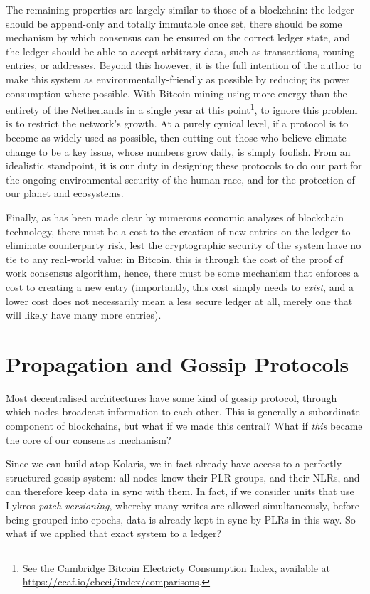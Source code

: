 \documentclass{extreport}
\begin{document}
The remaining properties are largely similar to those of a blockchain: the ledger should be append-only and totally immutable once set, there should be some mechanism by which consensus can be ensured on the correct ledger state, and the ledger should be able to accept arbitrary data, such as transactions, routing entries, or addresses. Beyond this however, it is the full intention of the author to make this system as environmentally-friendly as possible by reducing its power consumption where possible. With Bitcoin mining using more energy than the entirety of the Netherlands in a single year at this point\footnote{See the Cambridge Bitcoin Electricty Consumption Index, available at \url{https://ccaf.io/cbeci/index/comparisons}.}, to ignore this problem is to restrict the network's growth. At a purely cynical level, if a protocol is to become as widely used as possible, then cutting out those who believe climate change to be a key issue, whose numbers grow daily, is simply foolish. From an idealistic standpoint, it is our duty in designing these protocols to do our part for the ongoing environmental security of the human race, and for the protection of our planet and ecosystems.

Finally, as has been made clear by numerous economic analyses of blockchain technology, there must be a cost to the creation of new entries on the ledger to eliminate counterparty risk, lest the cryptographic security of the system have no tie to any real-world value: in Bitcoin, this is through the cost of the proof of work consensus algorithm, hence, there must be some mechanism that enforces a cost to creating a new entry (importantly, this cost simply needs to \emph{exist}, and a lower cost does not necessarily mean a less secure ledger at all, merely one that will likely have many more entries).

\chapter{Propagation and Gossip Protocols}
\label{sec:org9c2aa3a}

Most decentralised architectures have some kind of gossip protocol, through which nodes broadcast information to each other. This is generally a subordinate component of blockchains, but what if we made this central? What if \emph{this} became the core of our consensus mechanism?

Since we can build atop Kolaris, we in fact already have access to a perfectly structured gossip system: all nodes know their PLR groups, and their NLRs, and can therefore keep data in sync with them. In fact, if we consider units that use Lykros \emph{patch versioning}, whereby many writes are allowed simultaneously, before being grouped into epochs, data is already kept in sync by PLRs in this way. So what if we applied that exact system to a ledger?
\end{document}
